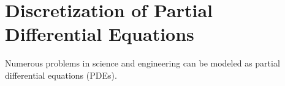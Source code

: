 \section{Discretization of Partial Differential Equations}
Numerous problems in science and engineering can be modeled as partial differential equations (PDEs). %
